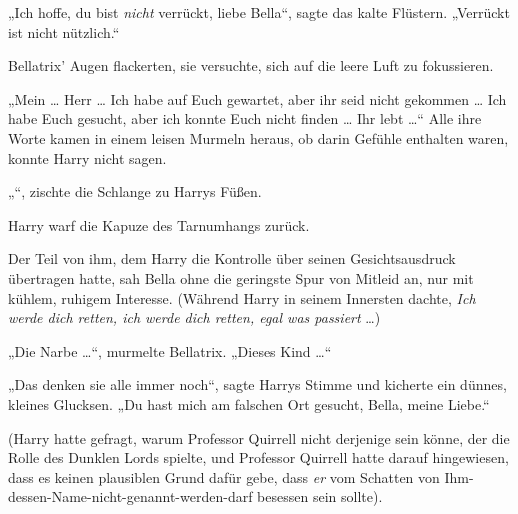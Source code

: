 „Ich hoffe, du bist \emph{nicht} verrückt, liebe Bella“, sagte das kalte Flüstern.
„Verrückt ist nicht nützlich.“

Bellatrix’ Augen flackerten, sie versuchte, sich auf die leere Luft zu fokussieren.

„Mein … Herr … Ich habe auf Euch gewartet, aber ihr seid nicht gekommen … Ich habe Euch gesucht, aber ich konnte Euch nicht finden … Ihr lebt …“ Alle ihre Worte kamen in einem leisen Murmeln heraus, ob darin Gefühle enthalten waren, konnte Harry nicht sagen.

„“, zischte die Schlange zu Harrys Füßen.

Harry warf die Kapuze des Tarnumhangs zurück.

Der Teil von ihm, dem Harry die Kontrolle über seinen Gesichtsausdruck übertragen hatte, sah Bella ohne die geringste Spur von Mitleid an, nur mit kühlem, ruhigem Interesse. (Während Harry in seinem Innersten dachte, \emph{Ich werde dich retten, ich werde dich retten, egal was passiert} …)

„Die Narbe …“, murmelte Bellatrix.
„Dieses Kind …“

„Das denken sie alle immer noch“, sagte Harrys Stimme und kicherte ein dünnes, kleines Glucksen.
„Du hast mich am falschen Ort gesucht, Bella, meine Liebe.“

(Harry hatte gefragt, warum Professor Quirrell nicht derjenige sein könne, der die Rolle des Dunklen Lords spielte, und Professor Quirrell hatte darauf hingewiesen, dass es keinen plausiblen Grund dafür gebe, dass \emph{er} vom Schatten von Ihm-dessen-Name-nicht-genannt-werden-darf besessen sein sollte).

